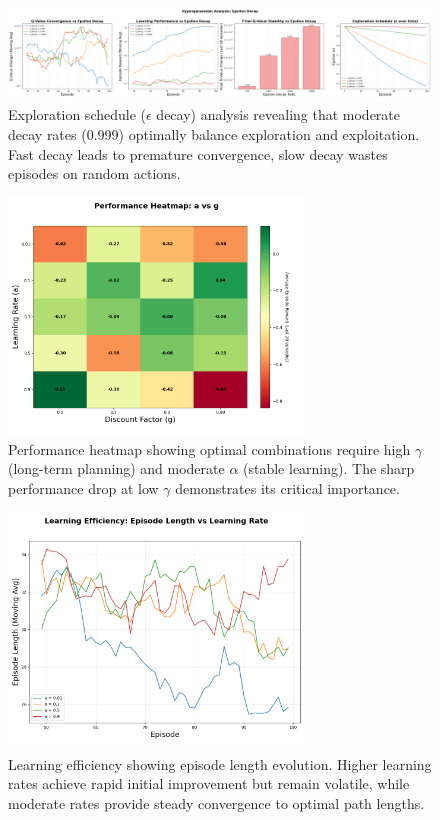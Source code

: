 \documentclass[11pt, a4paper]{article}
\begin{document}
\begin{figure}[H]
    \centering
    \includegraphics[width=\textwidth]{images/hyperparameter_analysis_epsilon_decay.png}
    \caption{Exploration schedule ($\epsilon$ decay) analysis revealing that moderate decay rates (0.999) optimally balance exploration and exploitation. Fast decay leads to premature convergence, slow decay wastes episodes on random actions.}\label{fig:hyperparameter_epsilon}
\end{figure}

\begin{figure}[H]
    \centering
    \includegraphics[width=0.7\textwidth]{images/hyperparameter_heatmap.png}
    \caption{Performance heatmap showing optimal combinations require high $\gamma$ (long-term planning) and moderate $\alpha$ (stable learning). The sharp performance drop at low $\gamma$ demonstrates its critical importance.}\label{fig:hyperparameter_heatmap}
\end{figure}

\begin{figure}[H]
    \centering
    \includegraphics[width=0.7\textwidth]{images/hyperparameter_efficiency.png}
    \caption{Learning efficiency showing episode length evolution. Higher learning rates achieve rapid initial improvement but remain volatile, while moderate rates provide steady convergence to optimal path lengths.}\label{fig:hyperparameter_efficiency}
\end{figure}
\end{document}
